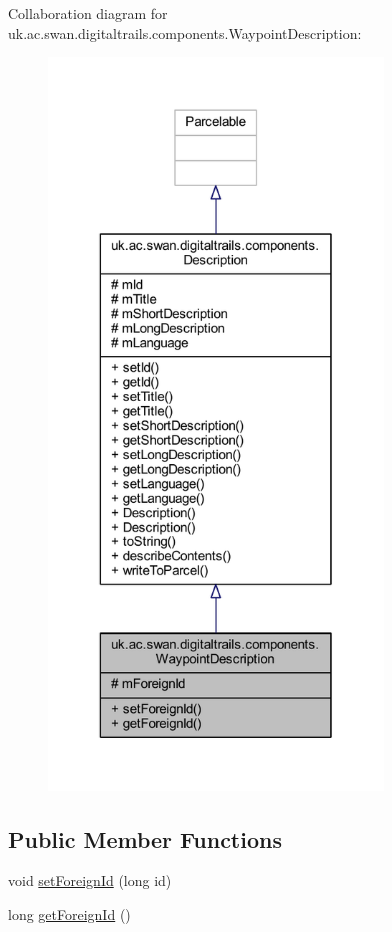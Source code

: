 Collaboration diagram for uk.\+ac.\+swan.\+digitaltrails.\+components.\+Waypoint\+Description\+:
\nopagebreak
\begin{figure}[H]
\begin{center}
\leavevmode
\includegraphics[height=550pt]{classuk_1_1ac_1_1swan_1_1digitaltrails_1_1components_1_1_waypoint_description__coll__graph}
\end{center}
\end{figure}
\subsection*{Public Member Functions}
\begin{DoxyCompactItemize}
\item 
void \hyperlink{classuk_1_1ac_1_1swan_1_1digitaltrails_1_1components_1_1_waypoint_description_a948f17dcaac7371e474ca957856f674a}{set\+Foreign\+Id} (long id)
\item 
long \hyperlink{classuk_1_1ac_1_1swan_1_1digitaltrails_1_1components_1_1_waypoint_description_aea823f8897693efc497955b489998095}{get\+Foreign\+Id} ()
\end{DoxyCompactItemize}
